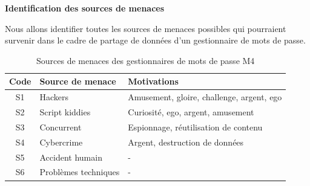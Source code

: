 \textbf{Identification des sources de menaces}

Nous allons identifier toutes les sources de menaces possibles qui pourraient survenir dans le cadre de partage de données d'un gestionnaire de mots de passe. 

\begin{table}[H]
	\centering
	\begin{tabular}{cll}
		\hline
		Code & Source de menace                & Motivations                               \\ \hline
		S1   & Hackers & Amusement, gloire, challenge, argent, ego \\
		S2   & Script kiddies                  & Curiosité, ego, argent, amusement         \\
		S3   & Concurrent                      & Espionnage, réutilisation de contenu      \\
		S4   & Cybercrime                      & Argent, destruction de données            \\
		S5   & Accident humain                 & -                                         \\
		S6   & Problèmes techniques            & -                                         \\ \hline
	\end{tabular}
	\caption{Sources de menaces des gestionnaires de mots de passe M4}
\end{table}

